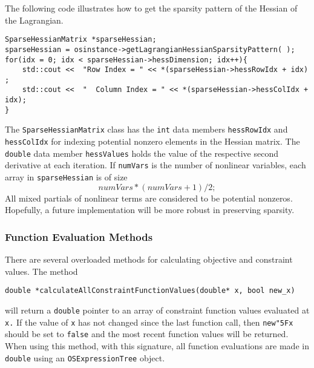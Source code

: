 \documentclass[11pt]{article}
\renewcommand{\_}{{\char"5F}}
\renewcommand{\{}{{\char"7B}}
\renewcommand{\}}{{\char"7D}}
\renewcommand{\^}{{\char"0D}}
\renewcommand{\'}{{\char"0D}}
\begin{document}
The following code illustrates how to get the sparsity pattern of the Hessian of the Lagrangian.
\begin{verbatim}
SparseHessianMatrix *sparseHessian;
sparseHessian = osinstance->getLagrangianHessianSparsityPattern( );
for(idx = 0; idx < sparseHessian->hessDimension; idx++){
	std::cout <<  "Row Index = " << *(sparseHessian->hessRowIdx + idx) ;
	std::cout <<  "  Column Index = " << *(sparseHessian->hessColIdx + idx);
}
\end{verbatim}
The {\tt SparseHessianMatrix} class has the {\tt int} data members {\tt hessRowIdx} and {\tt hessColIdx} for indexing  potential nonzero elements in the Hessian matrix. The {\tt double} data member {\tt hessValues} holds the value of the respective second derivative at each iteration.  If {\tt numVars} is the number of nonlinear variables, each array in {\tt sparseHessian} is of size 
$$
numVars*(numVars + 1)/2;
$$
All mixed partials of nonlinear terms are considered to be potential nonzeros.  Hopefully, a future implementation will be more robust in preserving sparsity. 


\subsubsection{Function Evaluation Methods}

There are several overloaded methods for calculating objective and constraint values.  The method
\begin{verbatim}
double *calculateAllConstraintFunctionValues(double* x, bool new_x)
\end{verbatim}
will return a {\tt double} pointer to an array of constraint function values evaluated at {\tt x.}  If the value of {\tt x} has not changed since the last function call, then {\tt new\_x} should be set to {\tt false} and the most recent function values will be returned.  When using this method, with this signature,  all function evaluations  are made in {\tt double} using an {\tt OSExpressionTree} object. 
\end{document}
